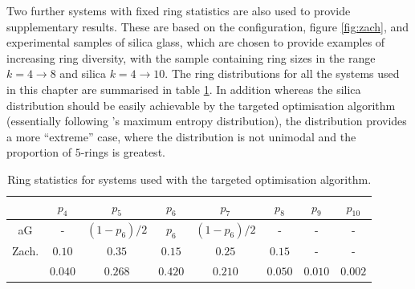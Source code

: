 Two further systems with fixed ring statistics are also used to provide supplementary results.
These are based on the \zach{} configuration, figure \ref{fig:zach}, and experimental samples of silica glass, which are chosen to provide examples of increasing ring diversity, with the \zach{} sample containing ring sizes in the range $k=4\rightarrow 8$ and silica $k=4\rightarrow 10$. 
The ring distributions for all the systems used in this chapter are summarised in table \ref{tab:toptpk}.
In addition whereas the silica distribution should be easily achievable by the targeted optimisation algorithm (essentially following \lm's maximum entropy distribution), the \zach{} distribution provides a more ``extreme'' case, where the distribution is not unimodal and the proportion of $5$-rings is greatest.


\begin{table}[h]
	\centering
	\caption{Ring statistics for systems used with the targeted optimisation algorithm.}
	\label{tab:toptpk}
	\begin{tabular}{c c c c c c c c}
	\toprule
	& $p_4$ & $p_5$ & $p_6$ & $p_7$ & $p_8$ & $p_9$ & $p_{10}$ \\[0.5mm]
	\midrule
	aG &- & $\left(1-p_6\right)/2$ & $p_6$ & $\left(1-p_6\right)/2$ & - & - & -  \\	
	Zach. & $0.10$ & $0.35$ & $0.15$ &  $0.25$ & $0.15$ & - & - \\	
	\sioii{} & $0.040$ & $0.268$ & $0.420$ & $0.210$ & $0.050$  & $0.010$ & $0.002$ \\
	\bottomrule	
	\end{tabular}
\end{table}

